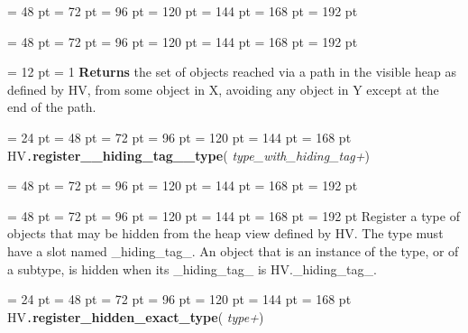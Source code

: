 {{{{\par \noindent  \leftskip = 48 pt  \leftmargini = 72 pt  \leftmarginii = 96 pt  \leftmarginiii = 120 pt  \leftmarginiv = 144 pt  \leftmarginv = 168 pt  \leftmarginvi = 192 pt {\par \noindent
\par}
\par}
{\par \noindent  \leftskip = 48 pt  \leftmargini = 72 pt  \leftmarginii = 96 pt  \leftmarginiii = 120 pt  \leftmarginiv = 144 pt  \leftmarginv = 168 pt  \leftmarginvi = 192 pt {\par \noindent
{\par \pagebreak[3.100000] \noindent \hangindent = 12 pt \hangafter = 1 
{\bf Returns \/} the set of objects reached via a path in the visible heap as
defined by HV, from some object in X, avoiding any object in Y except
at the end of the path.
\par}
\par}
\par}
\par}
\par}
{\par \noindent  \leftskip = 24 pt  \leftmargini = 48 pt  \leftmarginii = 72 pt  \leftmarginiii = 96 pt  \leftmarginiv = 120 pt  \leftmarginv = 144 pt  \leftmarginvi = 168 pt HV{\tt .\/}{\bf {\large {\bf register{\_}{\_}hiding{\_}tag{\_}{\_}type\/}}\/}( {\em type{\_}with{\_}hiding{\_}tag+\/}){\par \noindent
{\par \noindent  \leftskip = 48 pt  \leftmargini = 72 pt  \leftmarginii = 96 pt  \leftmarginiii = 120 pt  \leftmarginiv = 144 pt  \leftmarginv = 168 pt  \leftmarginvi = 192 pt {\par \noindent
\par}
\par}
{\par \noindent  \leftskip = 48 pt  \leftmargini = 72 pt  \leftmarginii = 96 pt  \leftmarginiii = 120 pt  \leftmarginiv = 144 pt  \leftmarginv = 168 pt  \leftmarginvi = 192 pt 
Register a type of objects that may be hidden from the heap view
defined by HV. The type must have a slot named {\_}hiding{\_}tag{\_}. An object
that is an instance of the type, or of a subtype, is hidden when its
{\_}hiding{\_}tag{\_} is HV.{\_}hiding{\_}tag{\_}.
\par}
\par}
\par}
{\par \noindent  \leftskip = 24 pt  \leftmargini = 48 pt  \leftmarginii = 72 pt  \leftmarginiii = 96 pt  \leftmarginiv = 120 pt  \leftmarginv = 144 pt  \leftmarginvi = 168 pt HV{\tt .\/}{\bf {\large {\bf register{\_}hidden{\_}exact{\_}type\/}}\/}( {\em type+\/}){\par \noindent
}}}
